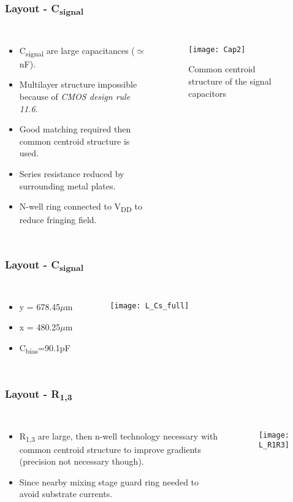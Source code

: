 \begin{frame}
\frametitle{Layout - C\textsubscript{signal}}
\begin{columns}
	\begin{itemize}
	\item C\textsubscript{signal} are large capacitances ($\simeq$nF). \item Multilayer structure impossible because of \emph{CMOS design rule 11.6}. \item Good matching required  then common centroid structure is used. \item Series resistance reduced by surrounding metal plates. \item N-well ring connected to V\textsubscript{DD} to reduce fringing field.
	\end{itemize}
	\begin{figure}[H]
		\centering
		\texttt{[image: Cap2]}
		\caption{Common centroid structure of the signal capacitors}
		\label{Cap2}
	\end{figure}
\end{columns}
\end{frame}

\begin{frame}
	\frametitle{Layout - C\textsubscript{signal}}
	\begin{columns}
	\begin{itemize}
		\item y = 678.45$\mu$m
		\item x = 480.25$\mu$m
		\item C\textsubscript{bias}=90.1pF
	\end{itemize}
	\begin{figure}[H]
		\centering
		\texttt{[image: L\_Cs\_full]}
		\label{L_Cs_full}
	\end{figure}
	\end{columns}
\end{frame}

\begin{frame}
\frametitle{Layout - R\textsubscript{1,3}}
\begin{columns}
	\column{0.5\textwidth}
	\begin{itemize}
	\item R\textsubscript{1,3} are large, then n-well technology necessary with common centroid structure to improve gradients (precision not necessary though). 
	\item Since nearby mixing stage guard ring needed to avoid substrate currents.
	\end{itemize}
	\column{0.5\textwidth}
	\begin{figure}[H]
		\centering
		\texttt{[image: L\_R1R3]}
		\label{L_R1R3}
	\end{figure}
\end{columns}
\end{frame}


